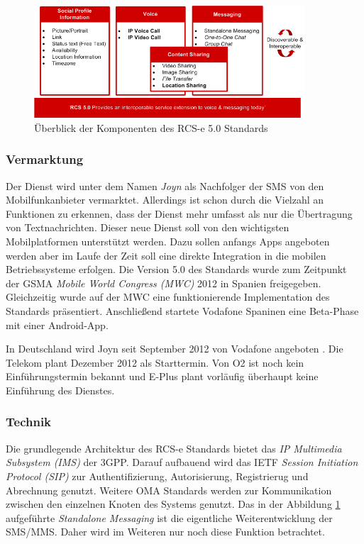 \documentclass[german,12pt,a4paper]{article}
\begin{document}
 \begin{figure}
     \centering
     \includegraphics[width=0.9\textwidth]{img/rcs-e-overview}
     \caption{Überblick der Komponenten des RCS-e 5.0 Standards \cite{rcs:spec}}
     \label{fig:rcs-e-overview}
 \end{figure}

  \subsubsection{Vermarktung} %
  \label{ssub:vermarktung}

  Der Dienst wird unter dem Namen \textit{Joyn} \cite{joyn} als \glqq{}Nachfolger der SMS\grqq{} von
  den Mobilfunkanbieter vermarktet. Allerdings ist schon durch die Vielzahl an Funktionen zu
  erkennen, dass der Dienst mehr umfasst als nur die Übertragung von Textnachrichten. Dieser neue
  Dienst soll von den wichtigsten Mobilplatformen unterstützt werden. Dazu sollen anfangs Apps
  angeboten werden aber im Laufe der Zeit soll eine direkte Integration in die mobilen
  Betriebssysteme erfolgen. Die Version 5.0 des Standards wurde zum Zeitpunkt der GSMA
  \textit{Mobile World Congress (MWC)} 2012 in Spanien freigegeben. Gleichzeitig wurde auf der MWC
  eine funktionierende Implementation des Standards präsentiert. Anschließend startete Vodafone
  Spaninen eine Beta-Phase mit einer Android-App.

  In Deutschland wird Joyn seit September 2012 von Vodafone angeboten \cite{stern}. Die Telekom plant Dezember
  2012 als Starttermin. Von O2 ist noch kein Einführungstermin bekannt
  und E-Plus plant vorläufig überhaupt keine Einführung des Dienstes.


  \subsubsection{Technik} %
  \label{ssub:technik}

    Die grundlegende Architektur des RCS-e Standards bietet das \textit{IP Multimedia Subsystem
    (IMS)} der 3GPP. Darauf aufbauend wird das IETF \textit{Session Initiation Protocol (SIP)} zur
    Authentifizierung, Autorisierung, Registrierug und Abrechnung genutzt. Weitere OMA Standards
    werden zur Kommunikation zwischen den einzelnen Knoten des Systems genutzt. Das in der Abbildung
    \ref{fig:rcs-e-overview} aufgeführte \textit{Standalone Messaging} ist die eigentliche
    Weiterentwicklung der SMS/MMS. Daher wird im Weiteren nur noch diese Funktion betrachtet.
\end{document}
